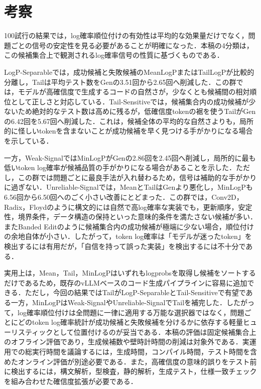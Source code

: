 \documentclass[submit,techrep,noauthor]{ipsj}
\begin{document}
\section{考察}

100試行の結果では，log確率順位付けの有効性は平均的な効果量だけでなく，問題ごとの信号の安定性を見る必要があることが明確になった．本稿の4分類は，この候補集合上で観測されるlog確率信号の性質に基づくものである．

LogP-Separableでは，成功候補と失敗候補のMeanLogPまたはTailLogPが比較的分離し，Tailは平均テスト数をGenの3.51回から2.65回へ削減した．この群では，モデルが高確信度で生成するコードの自然さが，少なくとも候補間の相対順位として正しさと対応している．Tail-Sensitiveでは，候補集合内の成功候補が少ないため絶対的なテスト数は高めに残るが，低確信度tokenの裾を使うTailがGenの6.42回を5.67回へ削減した．これは，候補全体の平均的な自然さよりも，局所的に怪しいtokenを含まないことが成功候補を早く見つける手がかりになる場合を示している．

一方，Weak-SignalではMinLogPがGenの2.86回を2.45回へ削減し，局所的に最も低いtoken log確率が候補品質の手がかりになる場合があることを示した．ただし，この群では問題ごとに最良手法が入れ替わるため，信号は補助的な手がかりに過ぎない．Unreliable-Signalでは，MeanとTailはGenより悪化し，MinLogPも6.56回から6.50回へのごく小さい改善にとどまった．この群では，Conv2D，Radix，Floydのように構文的には自然で高log確率な実装でも，更新順序，安定性，境界条件，データ構造の保持といった意味的条件を満たさない候補が多い．またBanded Editのように候補集合内の成功候補が極端に少ない場合，順位付けの余地自体が小さい．したがって，token log確率は「モデルが迷ったtoken」を検出するには有用だが，「自信を持って誤った実装」を検出するには不十分である．

実用上は，Mean，Tail，MinLogPはいずれもlogprobsを取得し候補をソートするだけであるため，既存のvLLMベースのコード生成パイプラインに容易に追加できる．ただし，今回の結果ではTailがLogP-SeparableとTail-Sensitiveで有望である一方，MinLogPはWeak-SignalやUnreliable-SignalでTailを補完した．したがって，log確率順位付けは全問題に一律に適用する万能な選択器ではなく，問題ごとにどのtoken log確率統計が成功候補と失敗候補を分けるかに依存する軽量ヒューリスティックとして位置付けるのが妥当である．本稿の評価は固定候補集合上のオフライン評価であり，生成候補数や壁時計時間の削減は対象外である．実運用での総実行時間を議論するには，生成時間，コンパイル時間，テスト時間を含めたオンライン評価が別途必要である．また，高確信度の意味的誤りをテスト前に検出するには，構文解析，型検査，静的解析，生成テスト，仕様一致チェックを組み合わせた確信度拡張が必要である．
\end{document}
